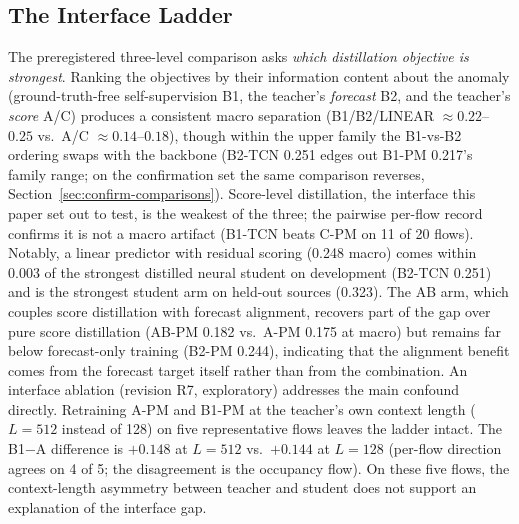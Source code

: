 \subsection{The Interface Ladder}\label{sec:dev-ladder}
The preregistered three-level comparison asks \emph{which
distillation objective is strongest}. Ranking the objectives by their
information content about the anomaly (ground-truth-free self-supervision B1,
the teacher's \emph{forecast} B2, and the teacher's \emph{score} A/C)
produces a consistent macro separation
(B1/B2/LINEAR $\approx 0.22$--$0.25$ vs.\ A/C $\approx 0.14$--$0.18$),
though within the upper family the B1-vs-B2 ordering swaps with the
backbone (B2-TCN 0.251 edges out B1-PM 0.217's family range; on the
confirmation set the same comparison reverses, Section~\ref{sec:confirm-comparisons}).
Score-level distillation, the interface this paper set out to test, is the
weakest of the three; the pairwise per-flow record confirms it is not a
macro artifact (B1-TCN beats C-PM on 11 of 20 flows). Notably, a linear
predictor with residual scoring (0.248 macro) comes within 0.003 of the
strongest distilled neural student on development (B2-TCN 0.251)
and is the strongest student arm on held-out sources (0.323). The AB arm, which couples score distillation with
forecast alignment, recovers part of the gap over pure score distillation
(AB-PM 0.182 vs.\ A-PM 0.175 at macro) but remains far below
forecast-only training (B2-PM 0.244), indicating that the alignment
benefit comes from the forecast target itself rather than from the
combination.
An interface ablation (revision R7, exploratory) addresses the main
confound directly. Retraining A-PM and B1-PM at the teacher's own
context length ($L{=}512$ instead of 128) on five representative flows
leaves the ladder intact. The B1$-$A difference is $+0.148$ at
$L{=}512$ vs.\ $+0.144$ at $L{=}128$ (per-flow direction agrees on 4 of
5; the disagreement is the occupancy flow). On these five flows, the
context-length asymmetry between teacher and student does not support
an explanation of the interface gap.

